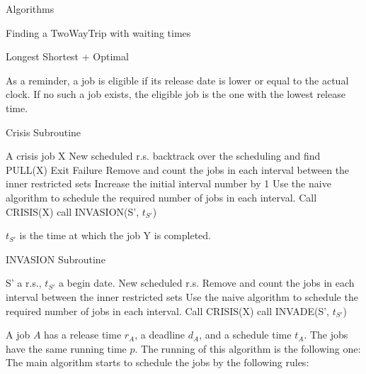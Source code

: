 \documentclass[a4paper,10pt]{report}
\begin{document}
\begin{chapter}{Algorithms}
\begin{section}{Finding a TwoWayTrip with waiting times}
\begin{subsection}{Longest Shortest + Optimal}
\begin{algorithm}[H]
\begin{algorithmic}
\ENDWHILE

\end{algorithmic}
\end{algorithm}
As a reminder, a job is eligible if its release date is lower or equal to the actual clock. If no such a job exists, the eligible job is the one
with the lowest release time.

 \begin{algorithm}[H]
\caption{Crisis Subroutine}
\begin{algorithmic}
\REQUIRE A crisis job X
\ENSURE New scheduled r.s.
\STATE backtrack over the scheduling and find PULL(X)
\STATE Exit Failure
\ENDIF 
\STATE Remove and count the jobs in each interval between the inner restricted sets
\STATE Increase the initial interval number by 1
\STATE Use the naive algorithm to schedule the required number of jobs in each interval.
\STATE Call CRISIS(X)
\ELSE
{}
\STATE call INVASION(S', $t_{S'}$)
\ENDIF
\ENDIF
\ENDWHILE

\end{algorithmic}
\end{algorithm}
$t_{S'}$ is the time at which the job Y is completed.


 \begin{algorithm}[H]
\caption{INVASION Subroutine}
\begin{algorithmic}
\REQUIRE S' a r.s., $t_{S'}$ a begin date.
\ENSURE New scheduled r.s.
\STATE Remove and count the jobs in each interval between the inner restricted sets
\STATE Use the naive algorithm to schedule the required number of jobs in each interval.
\STATE Call CRISIS(X)
\ELSE
{}
\STATE call INVADE(S', $t_{S'}$)
\ENDIF
\ENDIF
\ENDWHILE

\end{algorithmic}
\end{algorithm}


A job $A$ has a release time $r_A$, a deadline $d_A$, and a schedule time $t_A$. The jobs have the same running time $p$.
The running of this algorithm is the following one:
The main algorithm starts to schedule the jobs by the following rules:


\end{subsection}
\end{section}
\end{chapter}
\end{document}

